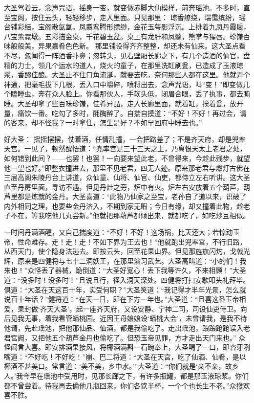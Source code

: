 \documentclass[12pt]{lsbook}
\begin{document}
大圣驾着云，念声咒语，摇身一变，就变做赤脚大仙模样，前奔瑶池。不多时，直至宝阁，按住云头，轻轻移步，走入里面。只见那里： 琼香缭绕，瑞霭缤纷，瑶台铺彩结，宝阁散氤氲。凤翥鸾腾形缥缈，金花玉萼影浮沉。上排着九凤丹霞扆，八宝紫霓墩。五彩描金桌，千花碧玉盆。桌上有龙肝和凤髓，熊掌与猩唇。珍馐百味般般美，异果嘉肴色色新。 那里铺设得齐齐整整，却还未有仙来。这大圣点看不尽，忽闻得一阵酒香扑鼻；忽转头，见右壁厢长廊之下，有几个造酒的仙官，盘糟的力士，领几个运水的道人，烧火的童子，在那里洗缸刷瓮，已造成了玉液琼浆，香醪佳酿。大圣止不住口角流涎，就要去吃，奈何那些人都在这里。他就弄个神通，把毫毛拔下几根，丢入口中嚼碎，喷将出去，念声咒语，叫“变！”即变做几个瞌睡虫，奔在众人脸上。你看那伙人，手软头低，闭眉合眼，丢了执事，都去盹睡。大圣却拿了些百味珍馐，佳肴异品，走入长廊里面，就着缸，挨着瓮，放开量，痛饮一番。吃勾了多时，酕醄醉了。自揣自摸道：“不好！不好！再过会，请的客来，却不怪我？一时拿住，怎生是好？不如早回府中睡去也。” 

好大圣：
摇摇摆摆，仗着酒，任情乱撞，一会把路差了；不是齐天府，却是兜率天宫。一见了，顿然醒悟道：“兜率宫是三十三天之上，乃离恨天太上老君之处，如何错到此间？——也罢！也罢！一向要来望此老，不曾得来，今趁此残步，就望他一望也好。”即整衣撞进去，那里不见老君，四无人迹。原来那老君与燃灯古佛在三层高阁朱陵丹台上讲道，众仙童、仙将、仙官、仙吏，都侍立左右听讲。这大圣直至丹房里面，寻访不遇，但见丹灶之旁，炉中有火。炉左右安放着五个葫芦，葫芦里都是炼就的金丹。大圣喜道：“此物乃仙家之至宝，老孙自了道以来，识破了内外相同之理，也要些金丹济入，不期到家无暇；今日有缘，却又撞着此物，趁老子不在，等我吃他几丸尝新。”他就把那葫芦都倾出来，就都吃了，如吃炒豆相似。

一时间丹满酒醒，又自己揣度道：“不好！不好！这场祸，比天还大；若惊动玉帝，性命难存。走！走！走！不如下界为王去也！”他就跑出兜率宫，不行旧路，从西天门，使个隐身法逃去。即按云头，回至花果山界。但见那旌旗闪灼，戈戟光辉，原来是四健将与七十二洞妖王，在那里演习武艺。大圣高叫道：“小的们！我来也！”众怪丢了器械，跪倒道：“大圣好宽心！丢下我等许久，不来相顾！”大圣道：“没多时！没多时！”且说且行，径入洞天深处。四健将打扫安歇叩头礼拜毕。俱道：“大圣在天这百十年，实受何职？”大圣笑道：“我记得才半年光景，怎么就说百十年话？”健将道：“在天一日，即在下方一年也。”大圣道：“且喜这番玉帝相爱，果封做‘齐天大圣’，起一座齐天府，又设安静、宁神二司，司设仙吏侍卫。向后见我无事，着我看管蟠桃园。近因王母娘娘设‘蟠桃大会’，未曾请我，是我不待他请，先赴瑶池，把他那仙品、仙酒，都是我偷吃了。走出瑶池，踉踉跄跄误入老君宫阙，又把他五个葫芦金丹也偷吃了。但恐玉帝见罪，方才走出天门来也。” 众怪闻言大喜。即安排酒果接风，将椰酒满斟一石碗奉上，大圣喝了一口，即咨牙咧嘴道：“不好吃！不好吃！”崩、巴二将道：“大圣在天宫，吃了仙酒、仙肴，是以椰酒不甚美口。常言道：‘美不美，乡中水。’”大圣道：“你们就是‘亲不亲，故乡人。’我今早在瑶池中受用时，见那长廊之下，有许多瓶罐，都是那玉液琼浆。你们都不曾尝着。待我再去偷他几瓶回来，你们各饮半杯，一个个也长生不老。”众猴欢喜不胜。
\end{document}
